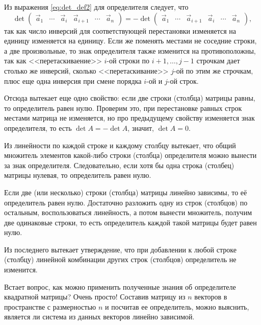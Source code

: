 	Из выражения \eqref{eq:det_def2} для определителя следует, что 
	\begin{equation}
		\det \begin{pmatrix}
			\vec{a}_1 & \cdots & \vec{a}_i & \vec{a}_{i+1} & \cdots & \vec{a}_n
		\end{pmatrix} = 
	-\det \begin{pmatrix}
			\vec{a}_1 & \cdots & \vec{a}_{i+1} & \vec{a}_i & \cdots & \vec{a}_n
		\end{pmatrix},
	\end{equation}
	так как число инверсий для соответствующей перестановки изменяется на единицу изменяется на единицу. Если же поменять местами не соседние строки, а две произвольные, то знак определителя также изменится на противоположны, так как <<перетаскиваение>> $i$-ой строки по $i+1, \ldots, j - 1$ строчкам дает столько же инверсий, сколько <<перетаскивание>> $j$-ой по этим же строчкам, плюс еще одна инверсия при смене порядка $i$-ой и $j$-ой строк.
	
	Отсюда вытекает еще одно свойство: если две строки (столбца) матрицы равны, то определитель равен нулю. Проверим это, при перестановке равных строк местами матрица не изменяется, но про предыдущему свойству изменяется знак определителя, то есть $\det A = - \det A$, значит, $\det A = 0$.
	
	Из линейности по каждой строке и каждому столбцу вытекает, что общий множитель элементов какой-либо строки (столбца) определителя можно вынести за знак определителя. Следовательно, если хотя бы одна строка (столбец) матрицы нулевая, то определитель равен нулю.

	Если две (или несколько) строки (столбца) матрицы линейно зависимы, то её определитель равен нулю. Достаточно разложить одну из строк (столбцов) по остальным, воспользоваться линейность, а потом вынести множитель, получим две одинаковые строки, то есть определитель каждой такой матрицы будет равен нулю.
	
	Из последнего вытекает утверждение, что при добавлении к любой строке (столбцу) линейной комбинации других строк (столбцов) определитель не изменится.
	
	Встает вопрос, как можно применить полученные знания об определителе квадратной матрицы? Очень просто! Составив матрицу из $n$ векторов в пространстве с размерностью $n$ и посчитав ее определитель, можно выяснить, является ли система из данных векторов линейно зависимой.